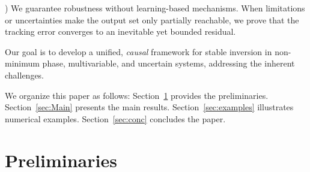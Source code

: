 \documentclass[journal]{IEEEtran}
\theoremstyle{remark}
\begin{document}
) We guarantee robustness without learning-based mechanisms. When limitations or uncertainties make the output set only partially reachable, we prove that the tracking error converges to an inevitable yet bounded residual.

Our goal is to develop a unified, \textit{causal} framework for stable inversion in non-minimum phase, multivariable, and uncertain systems, addressing the inherent challenges.

We organize this paper as follows: Section~\ref{sec:Prel} provides the preliminaries. Section~\ref{sec:Main} presents the main results. Section~\ref{sec:examples} illustrates numerical examples. Section~\ref{sec:conc} concludes the paper.
\section{Preliminaries} \label{sec:Prel}
\end{document}
